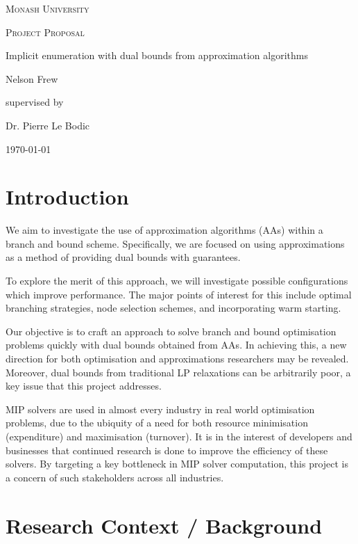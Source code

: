 \documentclass[12pt, a4paper]{article}
\begin{document}
\begin{titlepage}
  \centering
  {\scshape\LARGE Monash University \par}
  \vspace{1cm}
  {\scshape\Large Project Proposal \par}
  \vspace{1.5cm}
  {\huge Implicit enumeration with dual bounds from approximation algorithms\par}
  \vspace{2cm}
  {\Large Nelson Frew\par}
  \vfill
  supervised by\par
  Dr. Pierre Le Bodic
  \vfill
  {\large \today\par}
\end{titlepage}
\tableofcontents
\newpage
\section{Introduction}
We aim to investigate the use of approximation algorithms (AAs) within a branch and bound scheme. Specifically, we are focused on using approximations as a method of providing dual bounds with guarantees. 

To explore the merit of this approach, we will investigate possible configurations which improve performance. The major points of interest for this include optimal branching strategies, node selection schemes, and incorporating warm starting.

Our objective is to craft an approach to solve branch and bound optimisation problems quickly with dual bounds obtained from AAs. In achieving this, a new direction for both optimisation and approximations researchers may be revealed. Moreover, dual bounds from traditional LP relaxations can be arbitrarily poor, a key issue that this project addresses.

MIP solvers are used in almost every industry in real world optimisation problems, due to the ubiquity of a need for both resource minimisation (expenditure) and maximisation (turnover). It is in the interest of developers and businesses that continued research is done to improve the efficiency of these solvers. By targeting a key bottleneck in MIP solver computation, this project is a concern of such stakeholders across all industries. 

\section{Research Context / Background}
\end{document}
